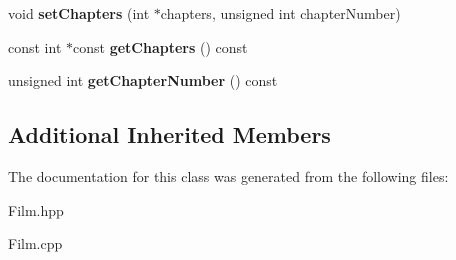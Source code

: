 \begin{DoxyCompactItemize}
\item 
\hypertarget{class_film_a08bd138cdeddb5a78525e08d5d18b860}{void {\bfseries set\-Chapters} (int $\ast$chapters, unsigned int chapter\-Number)}\label{class_film_a08bd138cdeddb5a78525e08d5d18b860}

\item 
\hypertarget{class_film_a0a065380396364f453d9aa12c81587d6}{const int $\ast$const {\bfseries get\-Chapters} () const }\label{class_film_a0a065380396364f453d9aa12c81587d6}

\item 
\hypertarget{class_film_a8330191ab410d94e59e0a367f5e7c39d}{unsigned int {\bfseries get\-Chapter\-Number} () const }\label{class_film_a8330191ab410d94e59e0a367f5e7c39d}

\end{DoxyCompactItemize}
\subsection*{Additional Inherited Members}


The documentation for this class was generated from the following files\-:\begin{DoxyCompactItemize}
\item 
Film.\-hpp\item 
Film.\-cpp\end{DoxyCompactItemize}
